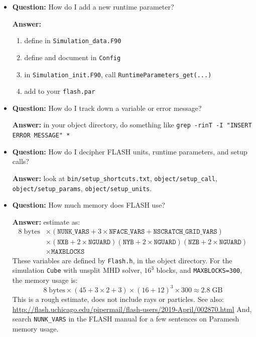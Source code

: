 \documentclass[10pt]{article}
\newcommand*{\mt}{\mathrm}
\newcommand*{\unit}[1]{\;\mt{#1}}  %
\begin{document}
\begin{itemize}

    \item \textbf{Question:} How do I add a new runtime parameter?

    \textbf{Answer:}
        \begin{enumerate}
            \item define in \texttt{Simulation\_data.F90}
            \item define and document in \texttt{Config}
            \item in \texttt{Simulation\_init.F90}, call \texttt{RuntimeParameters\_get(...)}
            \item add to your \texttt{flash.par}
        \end{enumerate}

    \item \textbf{Question:} How do I track down a variable or error message?

    \textbf{Answer:} in your object directory, do something like
        \texttt{grep -rinT -I "INSERT ERROR MESSAGE" *}

    \item \textbf{Question:} How do I decipher FLASH units, runtime parameters,
        and setup calls?

    \textbf{Answer:} look at
        \texttt{bin/setup\_shortcuts.txt},
        \texttt{object/setup\_call},
        \texttt{object/setup\_params},
        \texttt{object/setup\_units}.

    \item \textbf{Question:} How much memory does FLASH use?

    \textbf{Answer:} estimate as:
    \begin{align*}
        8 \unit{bytes}
        &\times \left( \mathtt{NUNK\_VARS} + 3\times\mathtt{NFACE\_VARS} + \mathtt{NSCRATCH\_GRID\_VARS} \right) \\
        &\times \left( \mathtt{NXB} + 2\times\mathtt{NGUARD} \right)
        \left( \mathtt{NYB} + 2\times\mathtt{NGUARD} \right)
        \left( \mathtt{NZB} + 2\times\mathtt{NGUARD} \right) \\
        &\times \mathtt{MAXBLOCKS}
    \end{align*}
    These variables are defined by \texttt{Flash.h}, in the object directory.
    For the simulation \texttt{Cube} with unsplit MHD solver,
    $16^3$ blocks, and \texttt{MAXBLOCKS=300}, the memory usage is:
    \[
        8 \unit{bytes} \times (45 + 3\times 2 + 3) \times (16 + 12)^3 \times 300
        \approx 2.8 \unit{GB}
    \]
    This is a rough estimate, does not include rays or particles.
    See also: \url{http://flash.uchicago.edu/pipermail/flash-users/2019-April/002870.html}
    And, search \texttt{NUNK\_VARS} in the FLASH manual for a few sentences
    on Paramesh memory usage.


\end{itemize}
\end{document}
